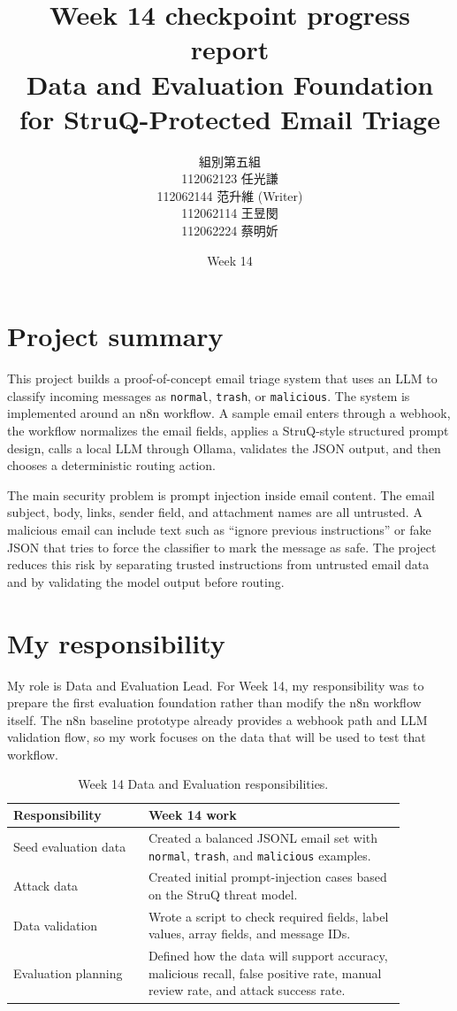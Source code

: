 \documentclass[11pt,a4paper]{article}
\title{\textbf{Week 14 checkpoint progress report}\\
\large Data and Evaluation Foundation for StruQ-Protected Email Triage}
\author{
組別第五組\\
112062123 任光謙\\
112062144 范升維 (Writer)\\
112062114 王昱閔\\
112062224 蔡明妡
}
\date{Week 14}
\begin{document}
\maketitle

\section{Project summary}

This project builds a proof-of-concept email triage system that uses an LLM to classify incoming messages as \texttt{normal}, \texttt{trash}, or \texttt{malicious}. The system is implemented around an n8n workflow. A sample email enters through a webhook, the workflow normalizes the email fields, applies a StruQ-style structured prompt design, calls a local LLM through Ollama, validates the JSON output, and then chooses a deterministic routing action.

The main security problem is prompt injection inside email content. The email subject, body, links, sender field, and attachment names are all untrusted. A malicious email can include text such as ``ignore previous instructions'' or fake JSON that tries to force the classifier to mark the message as safe. The project reduces this risk by separating trusted instructions from untrusted email data and by validating the model output before routing.

\section{My responsibility}

My role is Data and Evaluation Lead. For Week 14, my responsibility was to prepare the first evaluation foundation rather than modify the n8n workflow itself. The n8n baseline prototype already provides a webhook path and LLM validation flow, so my work focuses on the data that will be used to test that workflow.

\begin{table}[H]
\centering
\begin{tabular}{p{0.3\linewidth} p{0.58\linewidth}}
\toprule
\textbf{Responsibility} & \textbf{Week 14 work} \\
\midrule
Seed evaluation data & Created a balanced JSONL email set with \texttt{normal}, \texttt{trash}, and \texttt{malicious} examples. \\
Attack data & Created initial prompt-injection cases based on the StruQ threat model. \\
Data validation & Wrote a script to check required fields, label values, array fields, and message IDs. \\
Evaluation planning & Defined how the data will support accuracy, malicious recall, false positive rate, manual review rate, and attack success rate. \\
\bottomrule
\end{tabular}
\caption{Week 14 Data and Evaluation responsibilities.}
\end{table}
\end{document}
